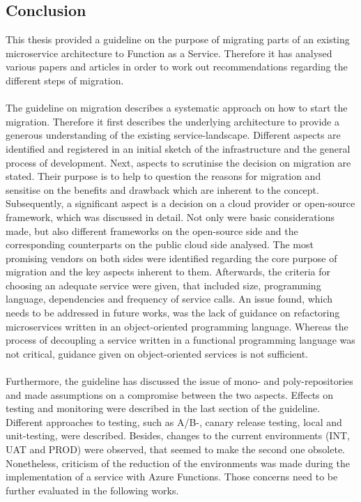 \documentclass[a4paper,twoside,11pt, pagesize]{scrartcl}
\begin{document}
\begin{spacing}{1.2}
\section{Conclusion}
This thesis provided a guideline on the purpose of migrating parts of an existing microservice architecture to Function as a Service. Therefore it has analysed various papers and articles in order to work out recommendations regarding the different steps of migration. \\\\The guideline on migration describes a systematic approach on how to start the migration. Therefore it first describes the underlying architecture to provide a generous understanding of the existing service-landscape. Different aspects are identified and registered in an initial sketch of the infrastructure and the general process of development. Next, aspects to scrutinise the decision on migration are stated. Their purpose is to help to question the reasons for migration and sensitise on the benefits and drawback which are inherent to the concept. Subsequently, a significant aspect is a decision on a cloud provider or open-source framework, which was discussed in detail. Not only were basic considerations made, but also different frameworks on the open-source side and the corresponding counterparts on the public cloud side analysed. The most promising vendors on both sides were identified regarding the core purpose of migration and the key aspects inherent to them. Afterwards, the criteria for choosing an adequate service were given, that included size, programming language, dependencies and frequency of service calls. An issue found,  which needs to be addressed in future works, was the lack of guidance on refactoring microservices written in an object-oriented programming language. Whereas the process of decoupling a service written in a functional programming language was not critical, guidance given on object-oriented services is not sufficient.
\\\\Furthermore, the guideline has discussed the issue of mono- and poly-repositories and made assumptions on a compromise between the two aspects. Effects on testing and monitoring were described in the last section of the guideline. Different approaches to testing, such as A/B-, canary release testing, local and unit-testing, were described. Besides, changes to the current environments (INT, UAT and PROD) were observed, that seemed to make the second one obsolete. Nonetheless, criticism of the reduction of the environments was made during the implementation of a service with Azure Functions. Those concerns need to be further evaluated in the following works.  
\newpage
\begin{spacing}{1}
  \printbibliography%
\end{spacing}
\end{spacing}
\end{document}
